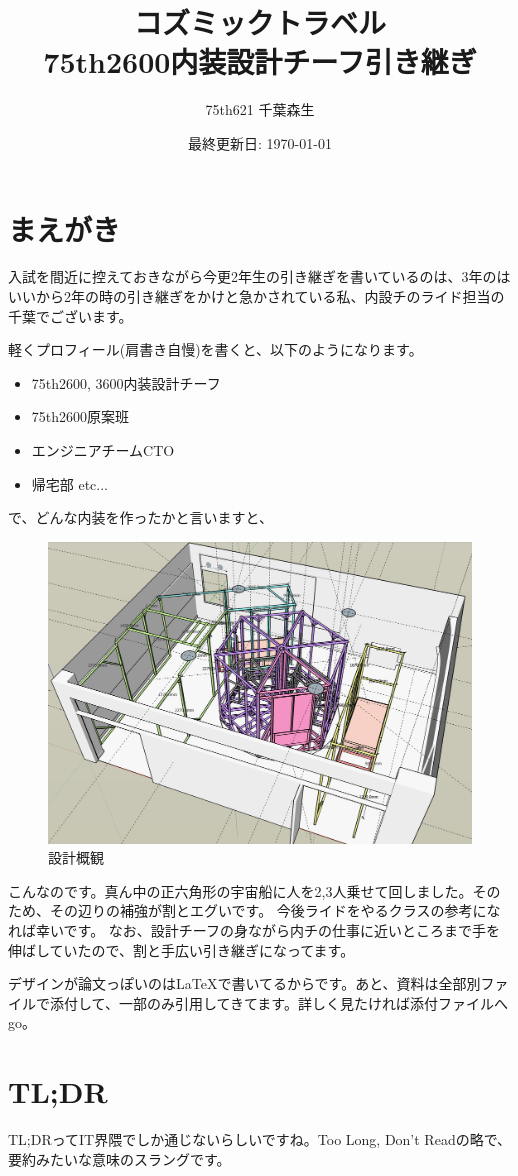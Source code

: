 \documentclass{jsarticle}
\title{
    コズミックトラベル \\
    \large 75th2600内装設計チーフ引き継ぎ
}
\author{75th621 千葉森生}
\date{最終更新日: \today}
\makeatletter
\newenvironment{imageHere}[2][htbp]{\def\@imageHereTmp{#2}%
    \begin{figure}[#1]
        \centering
}{%
        \caption{\@imageHereTmp}
        \label{figs:\@imageHereTmp}
    \end{figure}
}
\makeatother
\begin{document}
\maketitle

\section{まえがき}

入試を間近に控えておきながら今更2年生の引き継ぎを書いているのは、3年のはいいから2年の時の引き継ぎをかけと急かされている私、内設チのライド担当の千葉でございます。

軽くプロフィール(肩書き自慢)を書くと、以下のようになります。
\begin{itemize}
    \item 75th2600, 3600内装設計チーフ
    \item 75th2600原案班
    \item エンジニアチームCTO
    \item 帰宅部 etc...
\end{itemize}

で、どんな内装を作ったかと言いますと、

\begin{imageHere}{設計概観}
    \includegraphics[width=0.5\linewidth]{images/plan_overview/1.png}
\end{imageHere}

こんなのです。真ん中の正六角形の宇宙船に人を2,3人乗せて回しました。そのため、その辺りの補強が割とエグいです。
今後ライドをやるクラスの参考になれば幸いです。
なお、設計チーフの身ながら内チの仕事に近いところまで手を伸ばしていたので、割と手広い引き継ぎになってます。

デザインが論文っぽいのは\LaTeX{}で書いてるからです。あと、資料は全部別ファイルで添付して、一部のみ引用してきてます。詳しく見たければ添付ファイルへgo。

\clearpage

\tableofcontents

\section{TL;DR}
TL;DRってIT界隈でしか通じないらしいですね。Too Long, Don't Readの略で、要約みたいな意味のスラングです。
\end{document}
